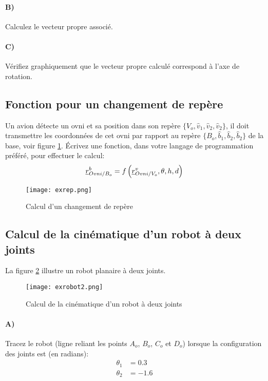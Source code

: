 \paragraph{B)} Calculez le vecteur propre associé.
\paragraph{C)} Vérifiez graphiquement que le vecteur propre calculé correspond à l’axe de rotation.


\subsection{Fonction pour un changement de repère}

Un avion détecte un ovni et sa position dans son repère $\{ V_o, \hat{v}_1, \hat{v}_2, \hat{v}_2\}$, il doit transmettre les coordonnées de cet ovni par rapport au repère $\{ B_o, \hat{b}_1, \hat{b}_2, \hat{b}_2\}$ de la base, voir figure \ref{fig:exrep}. Écrivez une fonction, dans votre langage de programmation préféré, pour effectuer le calcul:
\begin{align}
	\underline{r}^b_{Ovni/B_o} = f\left( \underline{r}^v_{Ovni/V_o}, \theta, h, d\right)
\end{align}
\begin{figure}[H]
	\centering
	\texttt{[image: exrep.png]}
	\caption{Calcul d'un changement de repère}
	\label{fig:exrep}
\end{figure}


\subsection{Calcul de la cinématique d'un robot à deux joints}

La figure \ref{fig:exrobot2} illustre un robot planaire à deux joints.
\begin{figure}[H]
	\centering
	\texttt{[image: exrobot2.png]}
	\caption{Calcul de la cinématique d'un robot à deux joints}
	\label{fig:exrobot2}
\end{figure}

\paragraph{A)}
Tracez le robot (ligne reliant les points $A_o$, $B_o$, $C_o$ et $D_o$) lorsque la configuration des joints est (en radians):
\begin{align}
	\theta_1 &= 0.3 \\
	\theta_2 &= -1.6
\end{align}

